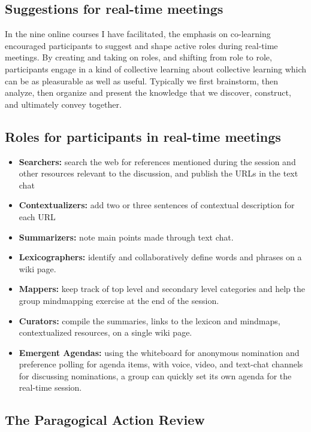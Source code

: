 \subsection{Suggestions for real-time meetings}

In the nine online courses I have facilitated, the emphasis on
co-learning encouraged participants to suggest and shape active roles
during real-time meetings. By creating and taking on roles, and shifting
from role to role, participants engage in a kind of collective learning
about collective learning which can be as pleasurable as well as useful.
Typically we first brainstorm, then analyze, then organize and present
the knowledge that we discover, construct, and ultimately convey
together.

\subsection{Roles for participants in real-time meetings}

\begin{itemize}
\item
  \textbf{Searchers:} search the web for references mentioned during the
  session and other resources relevant to the discussion, and publish
  the URLs in the text chat
\item
  \textbf{Contextualizers:} add two or three sentences of contextual
  description for each URL
\item
  \textbf{Summarizers:} note main points made through text chat.
\item
  \textbf{Lexicographers:} identify and collaboratively define words and
  phrases on a wiki page.
\item
  \textbf{Mappers:} keep track of top level and secondary level
  categories and help the group mindmapping exercise at the end of the
  session.
\item
  \textbf{Curators:} compile the summaries, links to the lexicon and
  mindmaps, contextualized resources, on a single wiki page.
\item
  \textbf{Emergent Agendas:} using the whiteboard for anonymous
  nomination and preference polling for agenda items, with voice, video,
  and text-chat channels for discussing nominations, a group can quickly
  set its own agenda for the real-time session.
\end{itemize}
\subsection{The Paragogical Action Review}

